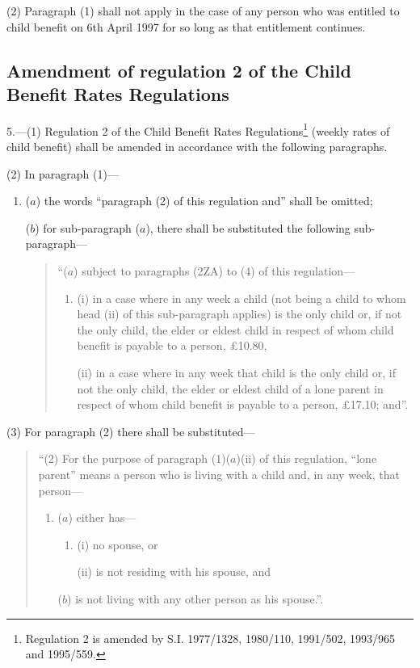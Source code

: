 \documentclass[a4paper]{article}
\newcommand\fnote[1]{\footnote{\frenchspacing #1}}
\begin{document}
(2) Paragraph (1) shall not apply in the case of any person who was entitled to child benefit on 6th April 1997 for so long as that entitlement continues.

\subsection[5. Amendment of regulation 2 of the Child Benefit Rates Regulations]{Amendment of regulation 2 of the Child Benefit Rates Regulations}

5.—(1) Regulation 2 of the Child Benefit Rates Regulations\fnote{Regulation 2 is amended by S.I. 1977/1328, 1980/110, 1991/502, 1993/965 and 1995/559.} (weekly rates of child benefit) shall be amended in accordance with the following paragraphs.

(2) In paragraph (1)—
\begin{enumerate}\item[]
($a$) the words “paragraph (2) of this regulation and” shall be omitted;

($b$) for sub-paragraph ($a$), there shall be substituted the following sub-paragraph—
\begin{quotation}
“($a$) subject to paragraphs (2ZA) to (4) of this regulation—
\begin{enumerate}\item[]
(i) in a case where in any week a child (not being a child to whom head (ii) of this sub-paragraph applies) is the only child or, if not the only child, the elder or eldest child in respect of whom child benefit is payable to a person, £10.80,

(ii) in a case where in any week that child is the only child or, if not the only child, the elder or eldest child of a lone parent in respect of whom child benefit is payable to a person, £17.10; and”.
\end{enumerate}
\end{quotation}
\end{enumerate}

(3) For paragraph (2) there shall be substituted—
\begin{quotation}
“(2) For the purpose of paragraph (1)($a$)(ii) of this regulation, “lone parent” means a person who is living with a child and, in any week, that person—
\begin{enumerate}\item[]
($a$) either has—
\begin{enumerate}\item[]
(i) no spouse, or

(ii) is not residing with his spouse, and
\end{enumerate}

($b$) is not living with any other person as his spouse.”.
\end{enumerate}
\end{quotation}
\end{document}
